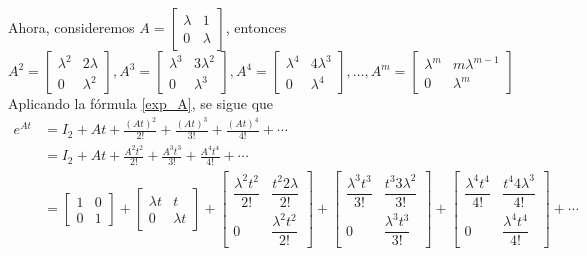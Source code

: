 \begin{example}\label{exam:eAt1}
    Ahora, consideremos $A = \begin{bmatrix} \lambda & 1 \\ 0 & \lambda \end{bmatrix}$, entonces
    $$A^2 = \begin{bmatrix} \lambda^2 & 2\lambda \\ 0 & \lambda^2 \end{bmatrix}, A^3 = \begin{bmatrix} \lambda^3 & 3\lambda^2 \\ 0 & \lambda^3 \end{bmatrix}, A^4 = \begin{bmatrix} \lambda^4 & 4\lambda^3 \\ 0 & \lambda^4 \end{bmatrix}, \dots, A^m = \begin{bmatrix} \lambda^m & m\lambda^{m - 1} \\ 0 & \lambda^m \end{bmatrix}$$
    Aplicando la fórmula \eqref{exp_A}, se sigue que
    \begin{align*}
        e^{At} & = I_2 + At + \frac{(At)^2}{2!} + \frac{(At)^3}{3!} + \frac{(At)^4}{4!} + \cdots \\
        & = I_2 + At + \frac{A^2t^2}{2!} + \frac{A^3t^3}{3!} + \frac{A^4t^4}{4!} + \cdots \\
        & = \begin{bmatrix} 1 & 0 \\ 0 & 1 \end{bmatrix} + \begin{bmatrix} \lambda t & t \\ 0 & \lambda t \end{bmatrix} + \begin{bmatrix} \dfrac{\lambda^2 t^2}{2!} & \dfrac{t^2 2\lambda}{2!} \\[3mm] 0 & \dfrac{\lambda^2 t^2}{2!} \end{bmatrix} + \begin{bmatrix} \dfrac{\lambda^3 t^3}{3!} & \dfrac{t^3 3\lambda^2}{3!} \\[3mm] 0 & \dfrac{\lambda^3 t^3}{3!} \end{bmatrix} + \begin{bmatrix} \dfrac{\lambda^4 t^4}{4!} & \dfrac{t^4 4\lambda^3}{4!} \\[3mm] 0 & \dfrac{\lambda^4 t^4}{4!} \end{bmatrix} + \cdots \\

\end{align*}
\end{example}
